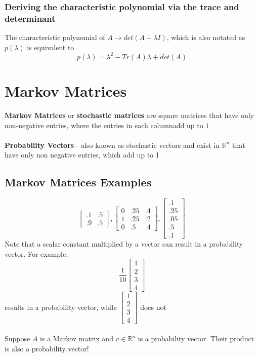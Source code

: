 \begin{enumerate}
\subsubsection{Deriving the characteristic polynomial via the 
trace and determinant}
The characteristic polynomial of $A \rightarrow det(A - \lambda I)$, 
which is also notated as $p(\lambda)$ is equivalent to
\[
  p(\lambda) = \lambda^2 - Tr(A)\lambda + det(A)
\]
\section{Markov Matrices}
\textbf{Markov Matrices} or \textbf{stochastic matrices} are square matrices that have only non-negative entries, where the entries in each columnadd up to $1$ \\\\
\textbf{Probability Vectors} - also known as stochastic vectors and 
exist in $\mathbb{R}^n$ that have only non negative entries, which add up to 1 
\subsection{Markov Matrices Examples}
\[
  \begin{bmatrix} .1 & .5 \\ .9 & .5 \end{bmatrix}, 
  \begin{bmatrix} 0 & .25 & .4 \\ 1 & .25 & .2 \\ 
    0 & .5 & .4 \end{bmatrix}, \begin{bmatrix} .1 \\ 
  .25 \\ .05 \\ .5 \\ .1 \end{bmatrix}
\]
Note that a scalar constant multiplied by a vector can result 
in a probability vector. For example, 
\[
  \frac{1}{10} \begin{bmatrix} 1 \\ 2 \\ 3 \\ 4 \end{bmatrix}
\]
results in a probability vector, while $\begin{bmatrix} 1 \\ 2 \\ 3 
\\ 4 \end{bmatrix}$ does not \\\\
Suppose $A$ is a Markov matrix and $v \in \mathbb{R}^n$ is a probability vector. Their product is also a probability vector! 

\end{enumerate}
